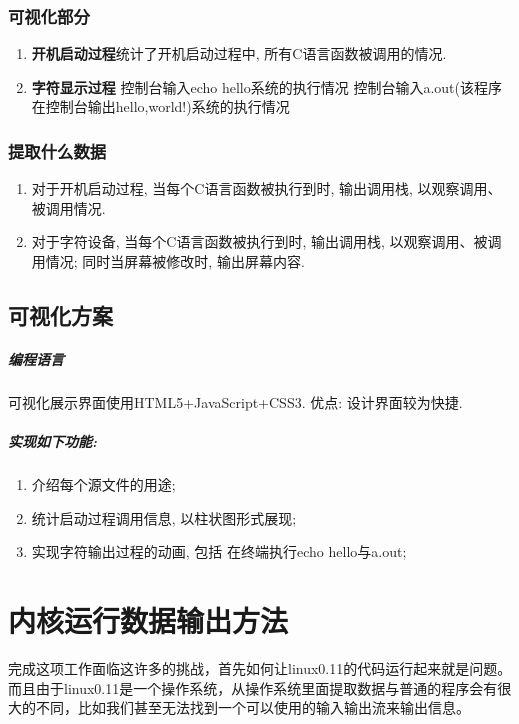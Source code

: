 \documentclass[]{report}
\begin{document}
\subsection{可视化部分}
\begin{enumerate}
    \item \textbf{开机启动过程}\quad 统计了开机启动过程中, 所有C语言函数被调用的情况. 
    \item \textbf{字符显示过程}
    \subitem 控制台输入echo hello系统的执行情况
    \subitem 控制台输入a.out(该程序在控制台输出hello,world!)系统的执行情况
\end{enumerate}
\subsection{提取什么数据}
\begin{enumerate}
    \item 对于开机启动过程, 当每个C语言函数被执行到时, 输出调用栈, 以观察调用、被调用情况.
    \item 对于字符设备, 当每个C语言函数被执行到时, 输出调用栈, 以观察调用、被调用情况; 同时当屏幕被修改时, 输出屏幕内容.
\end{enumerate}

\section{可视化方案}

\paragraph{编程语言}
可视化展示界面使用HTML5+JavaScript+CSS3. 优点: 设计界面较为快捷.
\paragraph{实现如下功能:}
\begin{enumerate}
    \item 介绍每个源文件的用途;
    \item 统计启动过程调用信息, 以柱状图形式展现;
    \item 实现字符输出过程的动画, 包括
    \subitem 在终端执行echo hello与a.out;
\end{enumerate}

\chapter{内核运行数据输出方法}

完成这项工作面临这许多的挑战，首先如何让linux0.11的代码运行起来就是问题。而且由于linux0.11是一个操作系统，从操作系统里面提取数据与普通的程序会有很大的不同，比如我们甚至无法找到一个可以使用的输入输出流来输出信息。
\end{document}
